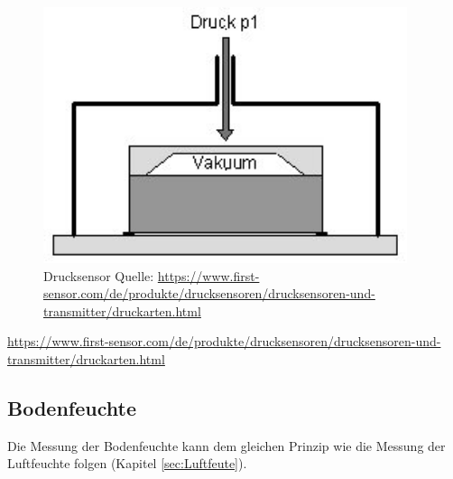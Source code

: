 \begin{figure}
\includegraphics[scale=0.5]{bilder/drucksensor} 
\caption{Drucksensor Quelle: \url{https://www.first-sensor.com/de/produkte/drucksensoren/drucksensoren-und-transmitter/druckarten.html}}
\label{Drucksensor}
\end{figure}

\url{https://www.first-sensor.com/de/produkte/drucksensoren/drucksensoren-und-transmitter/druckarten.html}

\subsection{Bodenfeuchte}
Die Messung der Bodenfeuchte kann dem gleichen Prinzip wie die Messung der Luftfeuchte folgen (Kapitel \ref{sec:Luftfeute}). 


 
